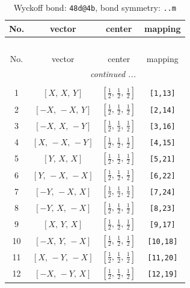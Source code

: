\documentclass[fleqn,8pt]{jsarticle}
\begin{document}
\begin{longtable}{cccc}
\caption{Wyckoff bond: {\tt 48d@4b}, bond symmetry: {\tt ..m}}
 \\
 \hline \hline
No. & vector & center & mapping \\ \hline \endfirsthead

\multicolumn{3}{l}{\tablename\ \thetable{}} \\
 \hline \hline
No. & vector & center & mapping \\ \hline \endhead

 \hline \hline
\multicolumn{3}{r}{\footnotesize\it continued ...} \\ \endfoot

 \hline \hline
\multicolumn{3}{r}{} \\ \endlastfoot

1 & $\left[ X,\, X,\, Y \right]$ & $\left[ \frac{1}{2},\, \frac{1}{2},\, \frac{1}{2} \right]$ & {\tt [1,13]} \\ \hline
2 & $\left[ - X,\, - X,\, Y \right]$ & $\left[ \frac{1}{2},\, \frac{1}{2},\, \frac{1}{2} \right]$ & {\tt [2,14]} \\ \hline
3 & $\left[ - X,\, X,\, - Y \right]$ & $\left[ \frac{1}{2},\, \frac{1}{2},\, \frac{1}{2} \right]$ & {\tt [3,16]} \\ \hline
4 & $\left[ X,\, - X,\, - Y \right]$ & $\left[ \frac{1}{2},\, \frac{1}{2},\, \frac{1}{2} \right]$ & {\tt [4,15]} \\ \hline
5 & $\left[ Y,\, X,\, X \right]$ & $\left[ \frac{1}{2},\, \frac{1}{2},\, \frac{1}{2} \right]$ & {\tt [5,21]} \\ \hline
6 & $\left[ Y,\, - X,\, - X \right]$ & $\left[ \frac{1}{2},\, \frac{1}{2},\, \frac{1}{2} \right]$ & {\tt [6,22]} \\ \hline
7 & $\left[ - Y,\, - X,\, X \right]$ & $\left[ \frac{1}{2},\, \frac{1}{2},\, \frac{1}{2} \right]$ & {\tt [7,24]} \\ \hline
8 & $\left[ - Y,\, X,\, - X \right]$ & $\left[ \frac{1}{2},\, \frac{1}{2},\, \frac{1}{2} \right]$ & {\tt [8,23]} \\ \hline
9 & $\left[ X,\, Y,\, X \right]$ & $\left[ \frac{1}{2},\, \frac{1}{2},\, \frac{1}{2} \right]$ & {\tt [9,17]} \\ \hline
10 & $\left[ - X,\, Y,\, - X \right]$ & $\left[ \frac{1}{2},\, \frac{1}{2},\, \frac{1}{2} \right]$ & {\tt [10,18]} \\ \hline
11 & $\left[ X,\, - Y,\, - X \right]$ & $\left[ \frac{1}{2},\, \frac{1}{2},\, \frac{1}{2} \right]$ & {\tt [11,20]} \\ \hline
12 & $\left[ - X,\, - Y,\, X \right]$ & $\left[ \frac{1}{2},\, \frac{1}{2},\, \frac{1}{2} \right]$ & {\tt [12,19]} \\
\end{longtable}
\end{document}
